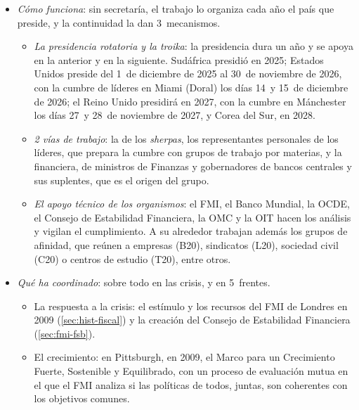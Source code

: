 \documentclass[11pt]{article}
\begin{document}
\begin{infografia}[!htb]
\centering
\caption{El G-20: miembros por regiones, funcionamiento, logros e hitos}\label{figu:g20}
\end{infografia}

\begin{itemize}
\item \emph{Cómo funciona}: sin secretaría, el trabajo lo organiza cada año el país que preside, y la continuidad la dan 3~mecanismos.
  \begin{itemize}
  \item \emph{La presidencia rotatoria y la troika}: la presidencia dura un año y se apoya en la anterior y en la siguiente. Sudáfrica presidió en 2025; Estados Unidos preside del 1~de diciembre de 2025 al 30~de noviembre de 2026, con la cumbre de líderes en Miami (Doral) los días 14~y 15~de diciembre de 2026; el Reino Unido presidirá en 2027, con la cumbre en Mánchester los días 27~y 28~de noviembre de 2027, y Corea del Sur, en 2028\nocite{EEUU2025PresidenciaG20,EEUU2026MiamiLogistica,ReinoUnido2026Manchester,G20Johannesburgo2025}.
  \item \emph{2 vías de trabajo}: la de los \emph{sherpas}, los representantes personales de los líderes, que prepara la cumbre con grupos de trabajo por materias, y la financiera, de ministros de Finanzas y gobernadores de bancos centrales y sus suplentes, que es el origen del grupo.
  \item \emph{El apoyo técnico de los organismos}: el FMI, el Banco Mundial, la OCDE, el Consejo de Estabilidad Financiera, la OMC y la OIT hacen los análisis y vigilan el cumplimiento. A su alrededor trabajan además los grupos de afinidad, que reúnen a empresas (B20), sindicatos (L20), sociedad civil (C20) o centros de estudio (T20), entre otros.
  \end{itemize}
\item \emph{Qué ha coordinado}: sobre todo en las crisis, y en 5~frentes.
  \begin{itemize}
  \item La respuesta a la crisis: el estímulo y los recursos del FMI de Londres en 2009 (\ref{sec:hist-fiscal}) y la creación del Consejo de Estabilidad Financiera (\ref{sec:fmi-fsb}).
  \item El crecimiento: en Pittsburgh, en 2009, el Marco para un Crecimiento Fuerte, Sostenible y Equilibrado, con un proceso de evaluación mutua en el que el FMI analiza si las políticas de todos, juntas, son coherentes con los objetivos comunes\nocite{G20Pittsburgh2009}.

\end{itemize}
\end{itemize}
\end{document}
